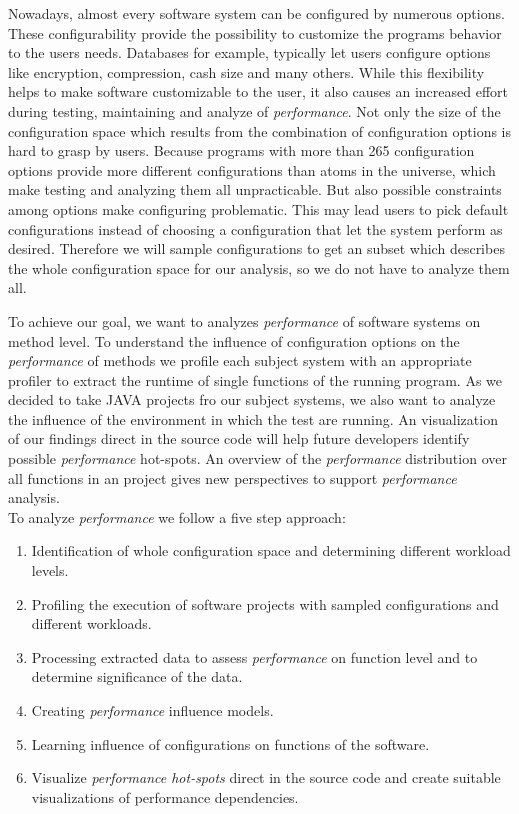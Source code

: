 Nowadays, almost every software system can be configured by numerous options. These configurability provide the possibility to customize the programs behavior to the users needs. Databases for example, typically let users configure options like encryption, compression, cash size and many others. While this flexibility helps to make software customizable to the user, it also causes an increased effort during testing, maintaining and analyze of \textit{performance}. Not only the size of the configuration space which results from the combination of configuration options is hard to grasp by users. Because programs with more than 265 configuration options provide more different configurations than atoms in the universe, which make testing and analyzing them all unpracticable. But also possible constraints among options make configuring problematic. This may lead users to pick default configurations instead of choosing a configuration that let the system perform as desired. Therefore we will sample configurations to get an subset which describes the whole configuration space for our analysis, so we do not have to analyze them all.


To achieve our goal, we want to analyzes \textit{performance} of software systems on method level. To understand the influence of configuration options on the \textit{performance} of methods we profile each subject system with an appropriate profiler to extract the runtime of single functions of the running program. As we decided to take JAVA projects fro our subject systems, we also want to analyze the influence of the environment in which the test are running. An visualization of our findings direct in the source code will help future developers identify possible \textit{performance} hot-spots. An overview of the \textit{performance} distribution over all functions in an project gives new perspectives to support \textit{performance} analysis.\\


To analyze \textit{performance} we follow a five step approach:

\begin{enumerate}
	\item Identification of whole configuration space and determining different workload levels.
	\item Profiling the execution of software projects with sampled configurations and different workloads.
	\item Processing extracted data to assess \textit{performance} on function level and to determine significance of the data.
	\item Creating \textit{performance} influence models.
	\item Learning influence of configurations on functions of the software.
	\item Visualize \textit{performance hot-spots} direct in the source code and create suitable visualizations of performance dependencies.
\end{enumerate}


